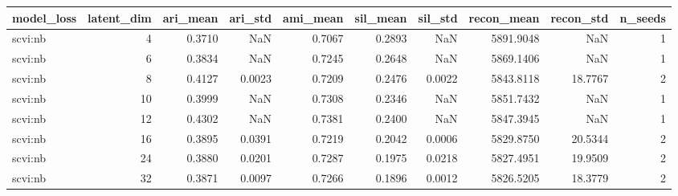 \begin{tabular}{lrrrrrrrrr}
\toprule
model\_loss & latent\_dim & ari\_mean & ari\_std & ami\_mean & sil\_mean & sil\_std & recon\_mean & recon\_std & n\_seeds \\
\midrule
scvi:nb & 4 & 0.3710 & NaN & 0.7067 & 0.2893 & NaN & 5891.9048 & NaN & 1 \\
scvi:nb & 6 & 0.3834 & NaN & 0.7245 & 0.2648 & NaN & 5869.1406 & NaN & 1 \\
scvi:nb & 8 & 0.4127 & 0.0023 & 0.7209 & 0.2476 & 0.0022 & 5843.8118 & 18.7767 & 2 \\
scvi:nb & 10 & 0.3999 & NaN & 0.7308 & 0.2346 & NaN & 5851.7432 & NaN & 1 \\
scvi:nb & 12 & 0.4302 & NaN & 0.7381 & 0.2400 & NaN & 5847.3945 & NaN & 1 \\
scvi:nb & 16 & 0.3895 & 0.0391 & 0.7219 & 0.2042 & 0.0006 & 5829.8750 & 20.5344 & 2 \\
scvi:nb & 24 & 0.3880 & 0.0201 & 0.7287 & 0.1975 & 0.0218 & 5827.4951 & 19.9509 & 2 \\
scvi:nb & 32 & 0.3871 & 0.0097 & 0.7266 & 0.1896 & 0.0012 & 5826.5205 & 18.3779 & 2 \\
\bottomrule
\end{tabular}
